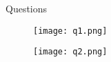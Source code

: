 \begin{frame}{{\color{violet}Questions}}

  \begin{figure}
    \centering
    \texttt{[image: q1.png]}
  \end{figure}

  \vspace{2ex}

  \begin{figure}
    \centering
    \texttt{[image: q2.png]}
  \end{figure}

\end{frame}
